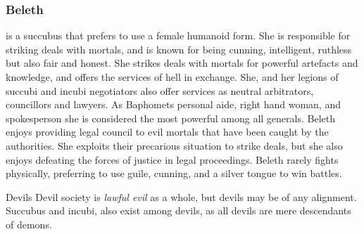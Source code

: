 \subsubsection{Beleth}
\label{sec:Beleth}

 is a succubus that prefers to use a female
humanoid form. She is responsible for striking deals with mortals, and is
known for being cunning, intelligent, ruthless but also fair and honest. She
strikes deals with mortals for powerful artefacts and knowledge, and offers
the services of hell in exchange. She, and her legions of succubi and incubi
negotiators also offer services as neutral arbitrators, councillors and
lawyers. As Baphomets personal aide, right hand woman, and spokesperson she is
considered the most powerful among all generals. Beleth enjoys providing legal
council to evil mortals that have been caught by the authorities. She exploits
their precarious situation to strike deals, but she also enjoys defeating the
forces of justice in legal proceedings. Beleth rarely fights physically,
preferring to use guile, cunning, and a silver tongue to win battles.

\begin{35e}{Devils}
  Devil society is \emph{lawful evil} as a whole, but devils may be of any
  alignment. Succubus and incubi, also exist among devils, as all devils are
  mere descendants of demons.
\end{35e}
